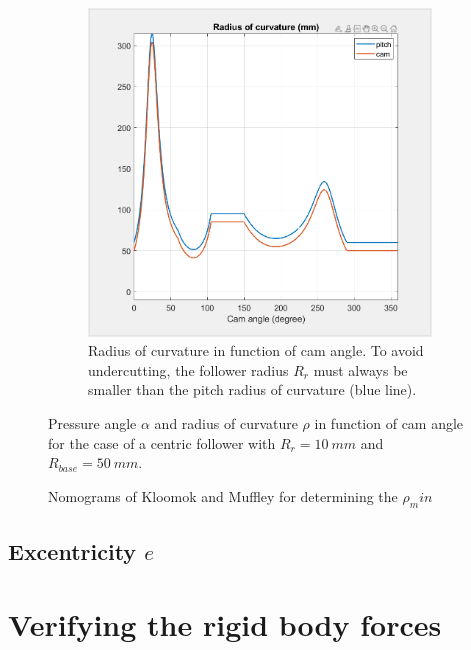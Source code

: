 \documentclass[a4paper]{article}
\begin{document}
\begin{figure}
\begin{subfigure}{.7\textwidth}
		\includegraphics[width=\textwidth]{radzonder.png}
		\caption{Radius of curvature in function of cam angle. To avoid undercutting, the follower radius \(R_r\) must always be smaller than the pitch radius of curvature (blue line).}
	\end{subfigure}
	
	\caption{Pressure angle \(\alpha\) and radius of curvature \(\rho\) in function of cam angle for the case of a centric follower with \(R_r=10~mm\) and \(R_{base}=50~mm\).}
	\label{fig:geozonder}
	
\end{figure}

\begin{figure}
	\centering
	
	
	
	
	\caption{Nomograms of Kloomok and Muffley for determining the \(\rho_min\)}
	\label{fig:nomogram2}
\end{figure}

\subsection{Excentricity \(e\)}



\section{Verifying the rigid body forces}
\end{document}
